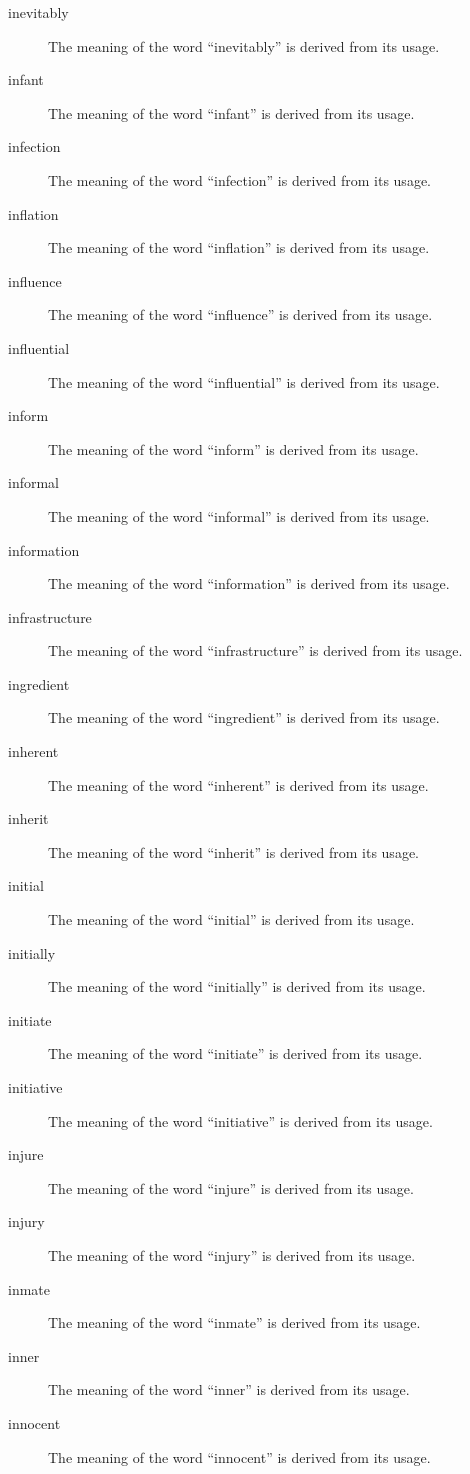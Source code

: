 \documentclass[12pt, letterpaper]{memoir}
\begin{document}
\begin{description}
\item[inevitably] The meaning of the word ``inevitably'' is derived from its usage.
\item[infant] The meaning of the word ``infant'' is derived from its usage.
\item[infection] The meaning of the word ``infection'' is derived from its usage.
\item[inflation] The meaning of the word ``inflation'' is derived from its usage.
\item[influence] The meaning of the word ``influence'' is derived from its usage.
\item[influential] The meaning of the word ``influential'' is derived from its usage.
\item[inform] The meaning of the word ``inform'' is derived from its usage.
\item[informal] The meaning of the word ``informal'' is derived from its usage.
\item[information] The meaning of the word ``information'' is derived from its usage.
\item[infrastructure] The meaning of the word ``infrastructure'' is derived from its usage.
\item[ingredient] The meaning of the word ``ingredient'' is derived from its usage.
\item[inherent] The meaning of the word ``inherent'' is derived from its usage.
\item[inherit] The meaning of the word ``inherit'' is derived from its usage.
\item[initial] The meaning of the word ``initial'' is derived from its usage.
\item[initially] The meaning of the word ``initially'' is derived from its usage.
\item[initiate] The meaning of the word ``initiate'' is derived from its usage.
\item[initiative] The meaning of the word ``initiative'' is derived from its usage.
\item[injure] The meaning of the word ``injure'' is derived from its usage.
\item[injury] The meaning of the word ``injury'' is derived from its usage.
\item[inmate] The meaning of the word ``inmate'' is derived from its usage.
\item[inner] The meaning of the word ``inner'' is derived from its usage.
\item[innocent] The meaning of the word ``innocent'' is derived from its usage.

\end{description}
\end{document}
